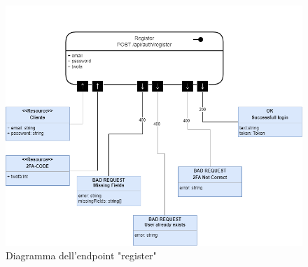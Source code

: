 \documentclass{report}
\begin{document}
\begin{figure}[H]
	\centering\includegraphics[width=1\textwidth]{images/microservizio-autenticazione/diagrams/diagramma_register.drawio.png}
	\caption{Diagramma dell'endpoint "register"}
\end{figure}
\end{document}
